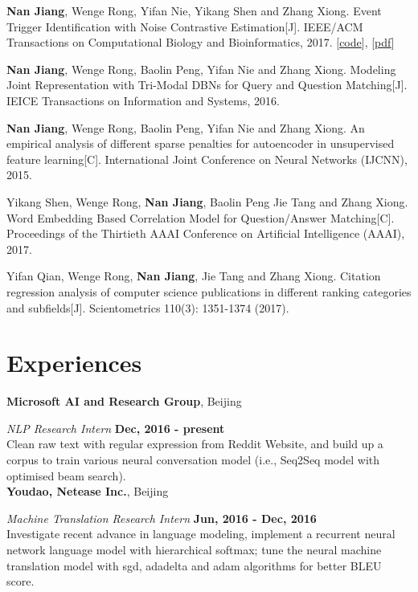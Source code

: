 \documentclass[margin,line]{resume}
\begin{document}
\begin{resume}
\textbf{Nan Jiang}, Wenge Rong, Yifan Nie, Yikang Shen and Zhang Xiong. Event Trigger Identification with Noise Contrastive Estimation[J]. IEEE/ACM Transactions on Computational Biology and Bioinformatics, 2017. [\href{https://github.com/jiangnanHugo/mlee-nce}{code}], [\href{https://github.com/jiangnanhugo/paper/blob/master/APBC2017/APBC2017.pdf}{pdf}]

\textbf{Nan Jiang}, Wenge Rong, Baolin Peng, Yifan Nie and Zhang Xiong. Modeling Joint Representation with Tri-Modal DBNs for Query and Question Matching[J]. IEICE Transactions on Information and Systems, 2016.

\textbf{Nan Jiang}, Wenge Rong, Baolin Peng, Yifan Nie and Zhang Xiong. An empirical analysis of different sparse penalties for autoencoder in unsupervised feature learning[C]. International Joint Conference on Neural Networks (IJCNN), 2015.

Yikang Shen, Wenge Rong, \textbf{Nan Jiang}, Baolin Peng Jie Tang and Zhang Xiong. Word Embedding Based Correlation Model for Question/Answer Matching[C]. Proceedings of the Thirtieth {AAAI} Conference on Artificial Intelligence (AAAI), 2017.

Yifan Qian, Wenge Rong, \textbf{Nan Jiang}, Jie Tang and Zhang Xiong. Citation regression analysis of computer science publications in different ranking categories and subfields[J]. Scientometrics 110(3): 1351-1374 (2017).



\section{Experiences}
{\bf Microsoft AI and Research Group}, Beijing

{\em NLP Research Intern} \hfill {\bf Dec, 2016 - present}\\
Clean raw text with regular expression from Reddit Website, and build up a corpus to train various neural conversation model (i.e., Seq2Seq model with optimised beam search).\\


{\bf Youdao, Netease Inc.}, Beijing

{\em Machine Translation Research Intern} \hfill {\bf Jun, 2016 - Dec, 2016}\\
Investigate recent advance in language modeling, implement a recurrent neural network language model with hierarchical softmax; tune the neural machine translation model with sgd, adadelta and adam algorithms for better BLEU score.\\



\end{resume}
\end{document}
